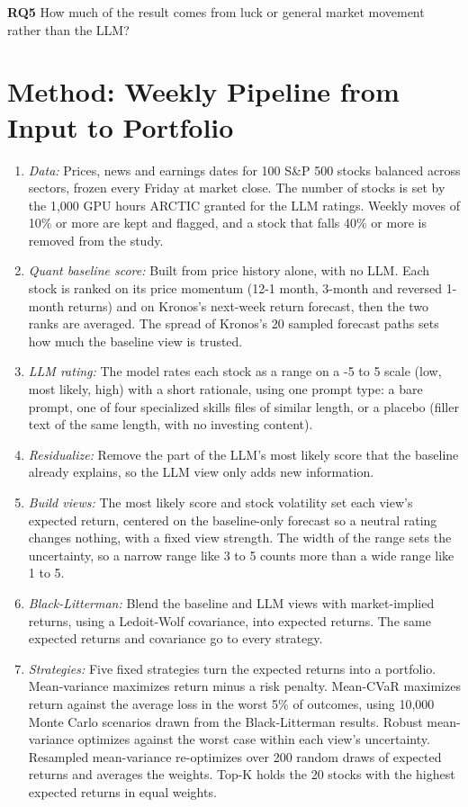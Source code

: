 \documentclass[conference]{IEEEtran}
\begin{document}
\noindent\textbf{RQ5} How much of the result comes from luck or general market movement rather than the LLM?

\section{Method: Weekly Pipeline from Input to Portfolio}
\begin{enumerate}
\item \textit{Data:} Prices, news and earnings dates for 100 S\&P 500 stocks balanced across sectors, frozen every Friday at market close. The number of stocks is set by the 1,000 GPU hours ARCTIC granted for the LLM ratings. Weekly moves of 10\% or more are kept and flagged, and a stock that falls 40\% or more is removed from the study.
\item \textit{Quant baseline score:} Built from price history alone, with no LLM. Each stock is ranked on its price momentum (12-1 month, 3-month and reversed 1-month returns) and on Kronos's next-week return forecast, then the two ranks are averaged. The spread of Kronos's 20 sampled forecast paths sets how much the baseline view is trusted.
\item \textit{LLM rating:} The model rates each stock as a range on a -5 to 5 scale (low, most likely, high) with a short rationale, using one prompt type: a bare prompt, one of four specialized skills files of similar length, or a placebo (filler text of the same length, with no investing content).
\item \textit{Residualize:} Remove the part of the LLM's most likely score that the baseline already explains, so the LLM view only adds new information.
\item \textit{Build views:} The most likely score and stock volatility set each view's expected return, centered on the baseline-only forecast so a neutral rating changes nothing, with a fixed view strength. The width of the range sets the uncertainty, so a narrow range like 3 to 5 counts more than a wide range like 1 to 5.
\item \textit{Black-Litterman:} Blend the baseline and LLM views with market-implied returns, using a Ledoit-Wolf covariance, into expected returns. The same expected returns and covariance go to every strategy.
\item \textit{Strategies:} Five fixed strategies turn the expected returns into a portfolio. Mean-variance maximizes return minus a risk penalty. Mean-CVaR maximizes return against the average loss in the worst 5\% of outcomes, using 10,000 Monte Carlo scenarios drawn from the Black-Litterman results. Robust mean-variance optimizes against the worst case within each view's uncertainty. Resampled mean-variance re-optimizes over 200 random draws of expected returns and averages the weights. Top-K holds the 20 stocks with the highest expected returns in equal weights.

\end{enumerate}
\end{document}
